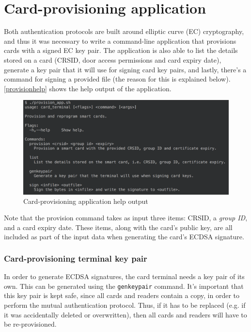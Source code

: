 \documentclass[12pt,a4paper,twoside,openright]{report}
\begin{document}
\section{Card-provisioning application}
\label{provisionapp}

Both authentication protocols are built around elliptic curve (EC) cryptography, and thus it was necessary to write a command-line application that provisions cards with a signed EC key pair. The application is also able to list the details stored on a card (CRSID, door access permissions and card expiry date), generate a key pair that it will use for signing card key pairs, and lastly, there's a command for signing a provided file (the reason for this is explained below). \autoref{provisionhelp} shows the help output of the application.

\begin{figure}[tbh]
\centerline{\includegraphics[scale=0.7]{figures/provisionhelp.png}}
\caption{Card-provisioning application help output}
\label{provisionhelp}
\end{figure}

Note that the provision command takes as input three items: CRSID, a \emph{group ID}, and a card expiry date. These items, along with the card's public key, are all included as part of the input data when generating the card's ECDSA signature.

\subsubsection{Card-provisioning terminal key pair}

In order to generate ECDSA signatures, the card terminal needs a key pair of its own. This can be generated using the \texttt{genkeypair} command. It's important that this key pair is kept safe, since all cards and readers contain a copy, in order to perform the mutual authentication protocol. Thus, if it has to be replaced (e.g. if it was accidentally deleted or overwritten), then all cards and readers will have to be re-provisioned.
\end{document}

